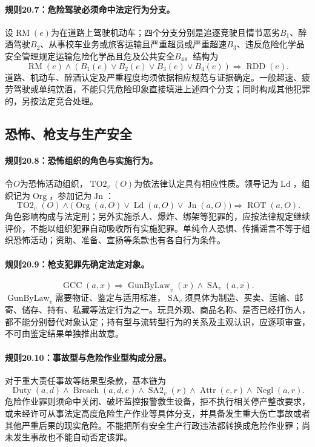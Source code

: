 \paragraph{规则20.7：危险驾驶必须命中法定行为分支。}
设$\operatorname{RM}(e)$为在道路上驾驶机动车；四个分支分别是追逐竞驶且情节恶劣$B_1$、醉酒驾驶$B_2$、从事校车业务或旅客运输且严重超员或严重超速$B_3$、违反危险化学品安全管理规定运输危险化学品且危及公共安全$B_4$。结构为
\[
\operatorname{RM}(e)\land(B_1(e)\lor B_2(e)\lor B_3(e)\lor B_4(e))
\Rightarrow\operatorname{RDD}(e).
\]
道路、机动车、醉酒认定及严重程度均须依据相应规范与证据确定。一般超速、疲劳驾驶或单纯饮酒，不能只凭危险印象直接填进上述四个分支；同时构成其他犯罪的，另按法定竞合处理。

\subsection{恐怖、枪支与生产安全}
\paragraph{规则20.8：恐怖组织的角色与实施行为。}
令$O$为恐怖活动组织，$\operatorname{TO2}_v(O)$为依法律认定具有相应性质。领导记为$\operatorname{Ld}$，组织记为$\operatorname{Org}$，参加记为$\operatorname{Jn}$：
\[
\operatorname{TO2}_v(O)\land
\bigl(\operatorname{Org}(a,O)\lor\operatorname{Ld}(a,O)
\lor\operatorname{Jn}(a,O)\bigr)
\Rightarrow\operatorname{ROT}(a,O).
\]
角色影响构成与法定刑；另外实施杀人、爆炸、绑架等犯罪的，应按法律规定继续评价，不能以组织犯罪自动吸收所有实施犯罪。单纯令人恐惧、传播谣言不等于组织恐怖活动；资助、准备、宣扬等条款也有各自行为条件。

\paragraph{规则20.9：枪支犯罪先确定法定对象。}
\[
\operatorname{GCC}(a,x)
\Rightarrow\operatorname{GunByLaw}_v(x)\land\operatorname{SA}_v(a,x).
\]
$\operatorname{GunByLaw}_v$需要物证、鉴定与适用标准，$\operatorname{SA}_v$须具体为制造、买卖、运输、邮寄、储存、持有、私藏等法定行为之一。玩具外观、商品名称、是否已经打伤人，都不能分别替代对象认定；持有型与流转型行为的关系及主观认识，应逐项审查，不可由鉴定结果单独推出故意。

\paragraph{规则20.10：事故型与危险作业型构成分层。}
对于重大责任事故等结果型条款，基本链为
\[
\operatorname{Duty}(a,d)\land\operatorname{Breach}(a,d,e)
\land\operatorname{SA2}_v(r)\land\operatorname{Attr}(e,r)
\land\operatorname{Negl}(a,r).
\]
危险作业罪则须命中关闭、破坏监控报警救生设备，拒不执行相关停产整改要求，或未经许可从事法定高度危险生产作业等具体分支，并具备发生重大伤亡事故或者其他严重后果的现实危险。不能把所有安全生产行政违法都转换成危险作业罪；尚未发生事故也不能自动否定该罪。

